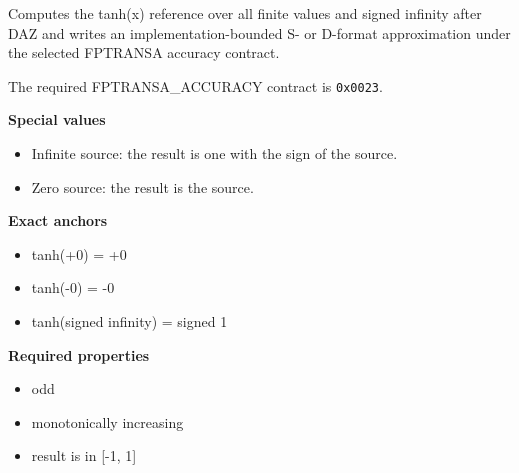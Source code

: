 Computes the tanh(x) reference over all finite values and signed infinity after DAZ and writes an implementation-bounded S- or D-format approximation under the selected FPTRANSA accuracy contract.

The required FPTRANSA\_ACCURACY contract is \texttt{0x0023}.

\textbf{Special values}\par
\begin{itemize}
\item Infinite source: the result is one with the sign of the source.
\item Zero source: the result is the source.
\end{itemize}

\textbf{Exact anchors}\par
\begin{itemize}
\item tanh(+0) = +0
\item tanh(-0) = -0
\item tanh(signed infinity) = signed 1
\end{itemize}

\textbf{Required properties}\par
\begin{itemize}
\item odd
\item monotonically increasing
\item result is in [-1, 1]
\end{itemize}
